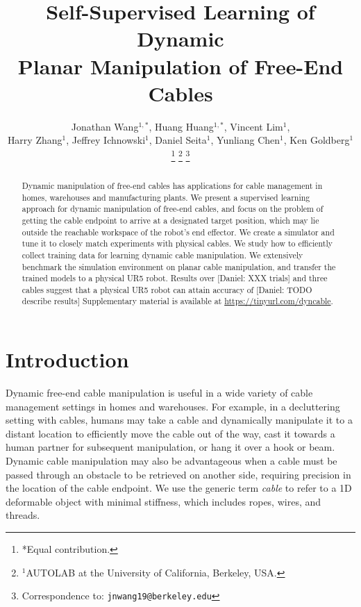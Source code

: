 \documentclass[letterpaper, 10 pt, conference]{ieeeconf}  %
\title{\LARGE \bf
Self-Supervised Learning of Dynamic \\ Planar Manipulation of Free-End Cables
}
\author{Jonathan Wang$^{1,*}$, Huang Huang$^{1,*}$, Vincent Lim$^{1}$,\\ Harry Zhang$^{1}$, Jeffrey Ichnowski$^1$, Daniel Seita$^1$, Yunliang Chen$^1$, Ken Goldberg$^1$%
\thanks{*Equal contribution.}%
\thanks{$^{1}$AUTOLAB at the University of California, Berkeley, USA.}%
\thanks{Correspondence to: {\tt\small jnwang19@berkeley.edu}}%
}
\newcommand{\remark}[3]{{\color{#2}[#1: #3]}}
\newcommand{\daniel}[1]{\remark{Daniel}{blue}{#1}}
\begin{document}
\maketitle
\thispagestyle{empty}
\pagestyle{empty}


\begin{abstract}
Dynamic manipulation of free-end cables has applications for cable management in homes, warehouses and manufacturing plants.
We present a supervised learning approach for dynamic manipulation of free-end cables, and focus on the problem of getting the cable endpoint to arrive at a designated target position, which may lie outside the reachable workspace of the robot's end effector.
We create a simulator and tune it to closely match experiments with physical cables. We study how to efficiently collect training data for learning dynamic cable manipulation. We extensively benchmark the simulation environment on planar cable manipulation, and transfer the trained models to a physical UR5 robot. Results over \daniel{XXX trials} and three cables suggest that a physical UR5 robot can attain accuracy of \daniel{TODO describe results}
Supplementary material is available at \url{https://tinyurl.com/dyncable}.
\end{abstract}

\section{Introduction}\label{sec:intro}

Dynamic free-end cable manipulation is useful in a wide variety of cable management settings in homes and warehouses. For example, in a decluttering setting with cables, humans may take a cable and dynamically manipulate it to a distant location to efficiently move the cable out of the way, cast it towards a human partner for subsequent manipulation, or hang it over a hook or beam. Dynamic cable manipulation may also be advantageous when a cable must be passed through an obstacle to be retrieved on another side, requiring precision in the location of the cable endpoint. We use the generic term \emph{cable} to refer to a 1D deformable object with minimal stiffness, which includes ropes, wires, and threads. 
\end{document}
